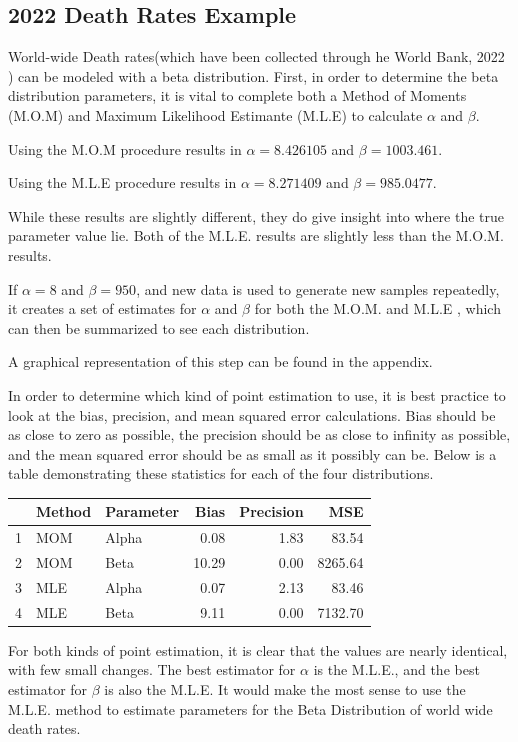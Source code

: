 \documentclass{article}\usepackage[]{graphicx}\usepackage[]{xcolor}
\begin{document}
\begin{multicols}{2}
\section{2022 Death Rates Example}
World-wide Death rates(which have been collected through he World Bank, 2022 ) can be modeled with a beta distribution. First, in order to determine the beta distribution parameters, it is vital to complete both a Method of Moments (M.O.M) and Maximum Likelihood Estimante (M.L.E) to calculate $\alpha$ and $\beta$. 

Using the M.O.M procedure results in $\alpha = 8.426105$ and $\beta = 1003.461$.

Using the M.L.E procedure results in $\alpha = 8.271409$ and $\beta = 985.0477$.

While these results are slightly different, they do give insight into where the true parameter value lie. Both of the M.L.E. results are slightly less than the M.O.M. results.

If $\alpha = 8$ and $\beta = 950$, and new data is used to generate new samples repeatedly, it creates a set of estimates for $\alpha$ and $\beta$ for both the M.O.M. and M.L.E , which can then be summarized to see each distribution.

A graphical representation of this step can be found in the appendix. 

In order to determine which kind of point estimation to use, it is best practice to look at the bias, precision, and mean squared error calculations. Bias should be as close to zero as possible, the precision should be as close to infinity as possible, and the mean squared error should be as small as it possibly can be. Below is a table demonstrating these statistics for each of the four distributions.

\begin{table}[H]
\centering
\begin{tabular}{rllrrr}
  \hline
 & Method & Parameter & Bias & Precision & MSE \\ 
  \hline
1 & MOM & Alpha & 0.08 & 1.83 & 83.54 \\ 
  2 & MOM & Beta & 10.29 & 0.00 & 8265.64 \\ 
  3 & MLE & Alpha & 0.07 & 2.13 & 83.46 \\ 
  4 & MLE & Beta & 9.11 & 0.00 & 7132.70 \\ 
   \hline
\end{tabular}
\end{table}

For both kinds of point estimation, it is clear that the values are nearly identical, with few small changes. The best estimator for $\alpha$ is the M.L.E., and the best estimator for $\beta$ is also the M.L.E. It would make the most sense to use the M.L.E. method to estimate parameters for the Beta Distribution of world wide death rates.




\end{multicols}
\end{document}
